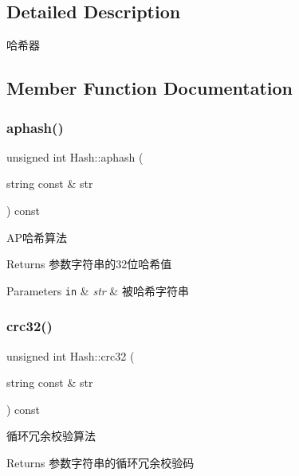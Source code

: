 \subsection{Detailed Description}
哈希器 

\subsection{Member Function Documentation}
\mbox{\label{class_hash_a05d68fb8603e00eb7b2bce77fd6539c5}} 
\subsubsection{\texorpdfstring{aphash()}{aphash()}}
{\footnotesize\ttfamily unsigned int Hash\+::aphash (\begin{DoxyParamCaption}\item[{string const \&}]{str }\end{DoxyParamCaption}) const}



A\+P哈希算法 

\begin{DoxyReturn}{Returns}
参数字符串的32位哈希值 
\end{DoxyReturn}

\begin{DoxyParams}[1]{Parameters}
\mbox{\tt in}  & {\em str} & 被哈希字符串 \\
\hline
\end{DoxyParams}
\mbox{\label{class_hash_afc6d940f27dc7f056cd41c171bd46b4c}} 
\subsubsection{\texorpdfstring{crc32()}{crc32()}}
{\footnotesize\ttfamily unsigned int Hash\+::crc32 (\begin{DoxyParamCaption}\item[{string const \&}]{str }\end{DoxyParamCaption}) const}



循环冗余校验算法 

\begin{DoxyReturn}{Returns}
参数字符串的循环冗余校验码 
\end{DoxyReturn}

